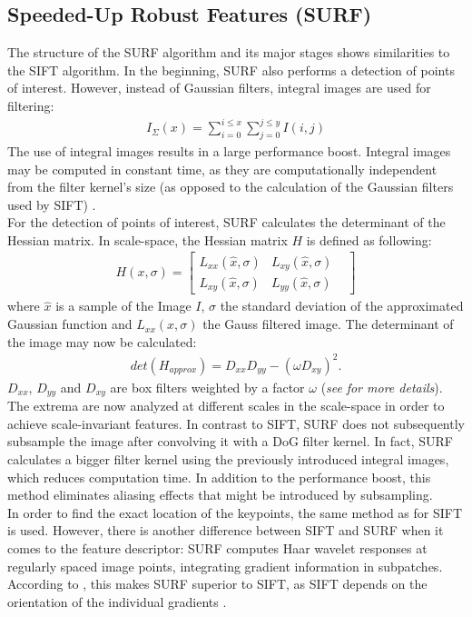 \documentclass[a4paper, 11pt]{article} %
\begin{document}
\subsection{Speeded-Up Robust Features (SURF)}
The structure of the SURF algorithm and its major stages shows similarities to the SIFT algorithm. In the beginning, SURF also performs a detection of points of interest. However, instead of Gaussian filters, integral images are used for filtering:
\begin{align}
I_{\Sigma}(x) = \sum_{i=0}^{i\leq x} \sum_{j = 0}^{j \leq y} I(i,j)
\end{align}
The use of integral images results in a large performance boost. Integral images may be computed in constant time, as they are computationally independent from the filter kernel's size (as opposed to the calculation of the Gaussian filters used by SIFT) \cite{bay2008speeded}. \\
For the detection of points of interest, SURF calculates the determinant of the Hessian matrix. In scale-space, the Hessian matrix $H$ is defined as following: 
\begin{align}
H(x, \sigma) = 
\begin{bmatrix}
L_{xx}(\widehat{x}, \sigma) & L_{xy}(\widehat{x},\sigma) &  \\
L_{xy}(\widehat{x},\sigma) & L_{yy}(\widehat{x}, \sigma) &  
\end{bmatrix}
\end{align}
where $\widehat{x}$ is a sample of the Image $I$, $\sigma$ the standard deviation of the approximated Gaussian function and $L_{xx}(x, \sigma)$ the Gauss filtered image. The determinant of the image may now be calculated:
\begin{align}
det(H_{approx}) = D_{xx} D_{yy} - (\omega D_{xy})^2.
\end{align}
$ D_{xx}$, $D_{yy}$ and $D_{xy}$ are box filters weighted by a factor $\omega$ (\textit{see} \cite{bay2008speeded} \textit{for more details}).\\
The extrema are now analyzed at different scales in the scale-space in order to achieve scale-invariant features. In contrast to SIFT, SURF does not subsequently subsample the image after convolving it with a DoG filter kernel. In fact, SURF calculates a bigger filter kernel using the previously introduced integral images, which reduces computation time. In addition to the performance boost, this method eliminates aliasing effects that might be introduced by subsampling. \\
In order to find the exact location of the keypoints, the same method as for SIFT is used. However, there is another difference between SIFT and SURF when it comes to the feature descriptor: SURF computes Haar wavelet responses at regularly spaced image points, integrating gradient information in subpatches. According to \citeauthor{bay2008speeded}, this makes SURF superior to SIFT, as SIFT depends on the orientation of the individual gradients \cite{bay2008speeded}. 
\end{document}
